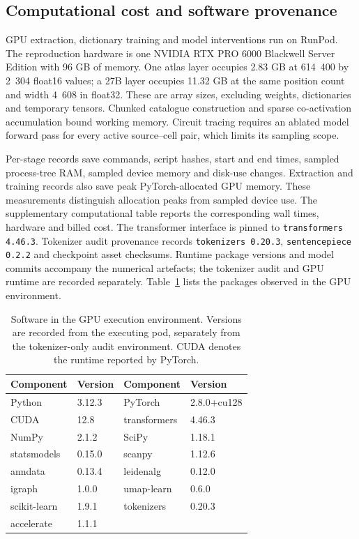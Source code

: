 \documentclass[review,authoryear,12pt]{elsarticle}
\begin{document}
\subsection{Computational cost and software provenance}

GPU extraction, dictionary training and model interventions run on RunPod. The reproduction
hardware is one NVIDIA RTX PRO 6000 Blackwell Server Edition with 96 GB of memory.
One atlas layer occupies 2.83 GB at 614~400 by 2~304 float16 values; a 27B layer occupies
11.32 GB at the same position count and width 4~608 in float32. These are array sizes, excluding
weights, dictionaries and temporary tensors. Chunked catalogue construction and sparse
co-activation accumulation bound working memory. Circuit tracing requires an ablated model
forward pass for every active source--cell pair, which limits its sampling scope.

Per-stage records save commands, script hashes, start and end times, sampled process-tree RAM,
sampled device memory and disk-use changes. Extraction and training records also save peak
PyTorch-allocated GPU memory. These measurements distinguish allocation peaks from sampled
device use. The supplementary computational table reports the corresponding wall times,
hardware and billed cost. The transformer interface is pinned to \texttt{transformers 4.46.3}.
Tokenizer audit provenance records \texttt{tokenizers 0.20.3}, \texttt{sentencepiece 0.2.2}
and checkpoint asset checksums. Runtime package versions and model commits accompany the
numerical artefacts; the tokenizer audit and GPU runtime are recorded separately.
Table~\ref{tab:software} lists the packages observed in the GPU environment.

\begin{table}[htbp]
\centering\small
\caption{Software in the GPU execution environment. Versions are recorded from the executing
pod, separately from the tokenizer-only audit environment. CUDA denotes the runtime reported
by PyTorch.}
\label{tab:software}
\begin{tabular}{ll ll}
\toprule
Component & Version & Component & Version \\
\midrule
Python & 3.12.3 & PyTorch & 2.8.0+cu128 \\
CUDA & 12.8 & transformers & 4.46.3 \\
NumPy & 2.1.2 & SciPy & 1.18.1 \\
statsmodels & 0.15.0 & scanpy & 1.12.6 \\
anndata & 0.13.4 & leidenalg & 0.12.0 \\
igraph & 1.0.0 & umap-learn & 0.6.0 \\
scikit-learn & 1.9.1 & tokenizers & 0.20.3 \\
accelerate & 1.1.1 & & \\
\bottomrule
\end{tabular}
\end{table}
\end{document}
